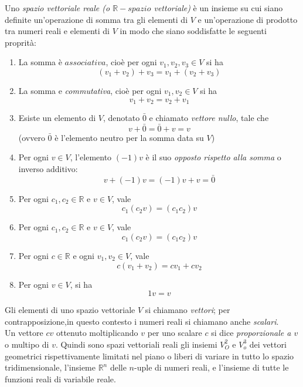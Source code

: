 \begin{defi}
  \label{def:spaziovect1}
  Uno \textit{spazio vettoriale reale (o $\mathds{R}-spazio$ vettoriale)} è un insieme su cui siano definite un'operazione di somma tra gli elementi di $V$ e un'operazione di prodotto tra numeri reali e elementi di $V$ in modo che siano soddisfatte le seguenti proprità:
  \begin{enumerate}
  \item La somma è $associativa$, cioè per ogni $v_1,v_2,v_3\in V$ si ha
    \begin{equation*}
      (v_1+v_2)+v_3=v_1+(v_2+v_3)
    \end{equation*}
  \item La somma e \textit{commutativa}, cioè per ogni $v_1,v_2\in V$ si ha
    \begin{equation*}
      v_1+v_2=v_2+v_1
    \end{equation*}
  \item Esiste un elemento di $V$, denotato $\bar{0}$ e chiamato \textit{vettore nullo}, tale che
    \begin{equation*}
      v+\bar{0}=\bar{0}+v=v
    \end{equation*}
    (ovvero $\bar{0}$ è l'elemento neutro per la somma data su $V$)
  \item Per ogni $v\in V$, l'elemento $(-1)v$ è il suo \textit{opposto rispetto alla somma} o inverso additivo:
    \begin{equation*}
      v+(-1)v= (-1)v+v=\bar{0}
    \end{equation*}
  \item Per ogni $c_1,c_2\in \mathds{R}$ e $v\in V$, vale
    \begin{equation*}
      c_1(c_2v)=(c_1c_2)v
    \end{equation*}
  \item Per ogni $c_1,c_2\in \mathds{R}$ e $v\in V$, vale
    \begin{equation*}
      c_1(c_2v)=(c_1c_2)v
    \end{equation*}
  \item Per ogni $c\in\mathds{R}$ e ogni $v_1,v_2\in V$, vale
    \begin{equation*}
      c(v_1+v_2)=cv_1+cv_2
    \end{equation*}
  \item Per ogni $v\in V$, si ha
    \begin{equation*}
      1v=v
    \end{equation*}
  \end{enumerate}
  Gli elementi di uno spazio vettoriale $V$ si chiamano \textit{vettori}; per contrapposizione,in questo contesto i numeri reali si chiamano anche \textit{scalari}.\\
  Un vettore $cv$ ottenuto moltiplicando $v$ per uno scalare $c$ si dice \textit{proporzionale a $v$} o multipo di $v$. Quindi sono spazi vettoriali reali gli insiemi $V_O^2$ e $V_o^3$ dei vettori geometrici rispettivamente limitati nel piano o liberi di variare in tutto lo spazio tridimensionale, l'insieme $\mathds{R}^n$ delle $n$-uple di numeri reali, e l'insieme di tutte le funzioni reali di variabile reale.
\end{defi}
